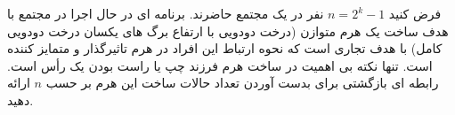 \exercise
فرض کنید
$n = 2^k -1$
نفر در یک مجتمع حاضرند. برنامه ای در حال اجرا در مجتمع با هدف ساخت یک هرم متوازن (درخت دودویی با ارتفاع برگ های یکسان درخت دودویی کامل) با هدف تجاری است که نحوه ارتباط این افراد در هرم تاثیرگذار و متمایز کننده است. تنها نکته بی اهمیت در ساخت هرم فرزند چپ یا راست بودن یک ‫رأس‬ است. رابطه ای بازگشتی برای بدست آوردن تعداد حالات ساخت این هرم بر حسب
$n$
‫ارائه‬ دهید.